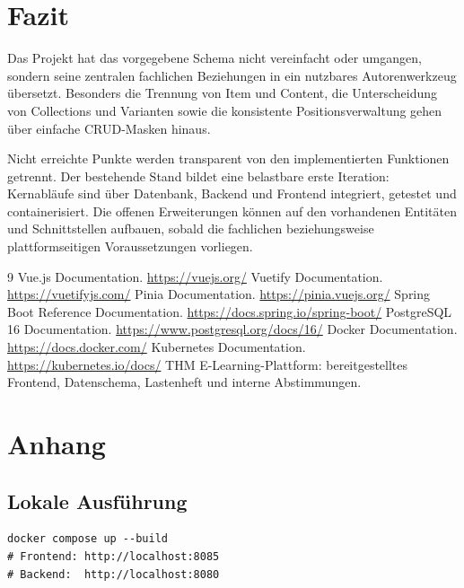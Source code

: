 ﻿\documentclass[11pt,a4paper]{article}
\begin{document}
\section{Fazit}
Das Projekt hat das vorgegebene Schema nicht vereinfacht oder umgangen,
sondern seine zentralen fachlichen Beziehungen in ein nutzbares
Autorenwerkzeug übersetzt. Besonders die Trennung von Item und Content, die
Unterscheidung von Collections und Varianten sowie die konsistente
Positionsverwaltung gehen über einfache CRUD-Masken hinaus.

Nicht erreichte Punkte werden transparent von den implementierten Funktionen
getrennt. Der bestehende Stand bildet eine belastbare erste Iteration:
Kernabläufe sind über Datenbank, Backend und Frontend integriert, getestet und
containerisiert. Die offenen Erweiterungen können auf den vorhandenen
Entitäten und Schnittstellen aufbauen, sobald die fachlichen beziehungsweise
plattformseitigen Voraussetzungen vorliegen.

\begin{thebibliography}{9}
 Vue.js Documentation. \url{https://vuejs.org/}
 Vuetify Documentation. \url{https://vuetifyjs.com/}
 Pinia Documentation. \url{https://pinia.vuejs.org/}
 Spring Boot Reference Documentation.
\url{https://docs.spring.io/spring-boot/}
 PostgreSQL 16 Documentation.
\url{https://www.postgresql.org/docs/16/}
 Docker Documentation. \url{https://docs.docker.com/}
 Kubernetes Documentation. \url{https://kubernetes.io/docs/}
 THM E-Learning-Plattform: bereitgestelltes Frontend,
Datenschema, Lastenheft und interne Abstimmungen.
\end{thebibliography}

\appendix
\section{Anhang}
\subsection{Lokale Ausführung}
\begin{verbatim}
docker compose up --build
# Frontend: http://localhost:8085
# Backend:  http://localhost:8080
\end{verbatim}
\end{document}
